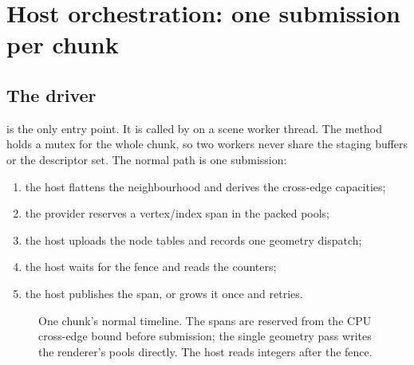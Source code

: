 \section{Host orchestration: one submission per chunk}
\label{sec:orch}

\subsection{The driver}

 is the only entry point.  It
is called by  on a scene worker
thread.  The method holds a mutex for the whole chunk, so two workers never
share the staging buffers or the descriptor set.  The normal path is one
submission:

\begin{enumerate}
\item the host flattens the neighbourhood and derives the cross-edge
  capacities;
\item the provider reserves a vertex/index span in the packed pools;
\item the host uploads the node tables and records one geometry dispatch;
\item the host waits for the fence and reads the counters;
\item the host publishes the span, or grows it once and retries.
\end{enumerate}

\begin{figure}[htbp]
\centering
{}
\caption{One chunk's normal timeline.  The spans are reserved from the CPU
cross-edge bound before submission; the single geometry pass writes the
renderer's pools directly.  The host reads integers after the fence.}
\label{fig:timeline}
\end{figure}

